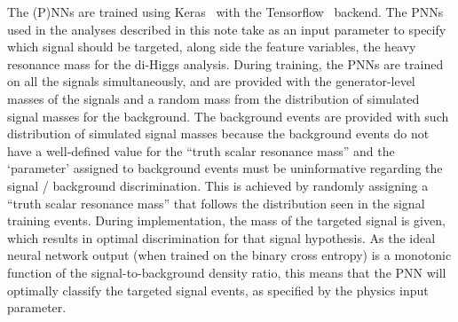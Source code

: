 The (P)NNs are trained using Keras~\cite{chollet2015keras} 
with the Tensorflow~\cite{tensorflow2015-whitepaper} backend. 
The PNNs used in the analyses described in this note take as an input parameter to specify which signal
should be targeted, along side the feature variables, the heavy resonance mass for the di-Higgs analysis.
During training, the PNNs are trained on all the signals simultaneously, and are provided with the
generator-level masses of the signals and a random mass from the distribution of simulated signal masses
for the background. The background events are provided with such distribution of simulated signal masses
because the background events do not have a well-defined value for the ``truth scalar resonance mass'' and
the `parameter' assigned to background events must be uninformative regarding the signal / background
discrimination. This is achieved by randomly assigning a ``truth scalar resonance mass'' that follows the
distribution seen in the signal training events. During implementation, the mass of the targeted signal
is given, which results in optimal discrimination for that signal hypothesis. As the ideal neural network
output (when trained on the binary cross entropy) is a monotonic function of the signal-to-background
density ratio, this means that the PNN will optimally classify the targeted signal events, as specified by the
physics input parameter.


